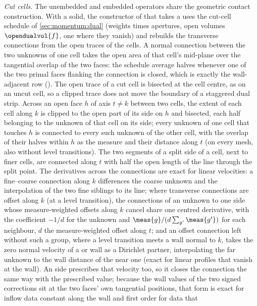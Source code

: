 \emph{Cut cells.} The unembedded and embedded operators share the geometric
contact construction. With a solid, the constructor of
 that takes a 
uses the cut-cell schedule of \cref{sec:momentum:dual} (weights times
apertures, open volumes $\opendualvol{f}$, one where they vanish) and rebuilds
the transverse connections from the open traces of the cells.
A normal connection between the two unknowns of one cell takes the open area
of that cell's mid-plane over the tangential overlap of the two faces: the
schedule average halves whenever one of the two primal faces flanking the
connection is closed, which is exactly the wall-adjacent row ().
The open trace of a cut cell is bisected at the cell centre, as on an uncut
cell, so a clipped trace does not move the boundary of a staggered dual
strip.
Across an open face $h$ of axis $t\neq k$ between two cells,
the extent of each cell along $k$ is clipped to the open part of its side on
$h$ and bisected, each half belonging to the unknown of that cell on its
side; every unknown of one cell that touches $h$ is connected to every such
unknown of the other cell, with the overlap of their halves within $h$ as
the measure and their distance along $t$ (on every mesh, also without level
transitions). The two segments of a split side of a cell, next to finer
cells, are connected along $t$ with half the open length of the line through
the split point. The derivatives across the connections are exact for linear
velocities: a fine--coarse connection along $k$ differences the coarse
unknown and the interpolation of the two fine siblings to its line; where
transverse connections are offset along $k$ (at a level transition), the
connections of an unknown to one side whose measure-weighted offsets along $k$
cancel share one centred derivative, with the coefficient $-1/d$ for the
unknown and $\meas{g}/(d\sum_{g'}\meas{g'})$ for each neighbour, $d$ the
measure-weighted offset along $t$; and an offset connection left without such
a group, where a level transition meets a wall normal to $k$, takes the zero
normal velocity of a  or  wall as a
Dirichlet partner, interpolating the far unknown to the wall distance of the
near one (exact for linear profiles that vanish at the wall). An
 side prescribes that velocity too, so it closes the connection
the same way with the prescribed value; because the wall values of the two
signed corrections sit at the two faces' own tangential positions, that form is
exact for inflow data constant along the wall and first order for data that
